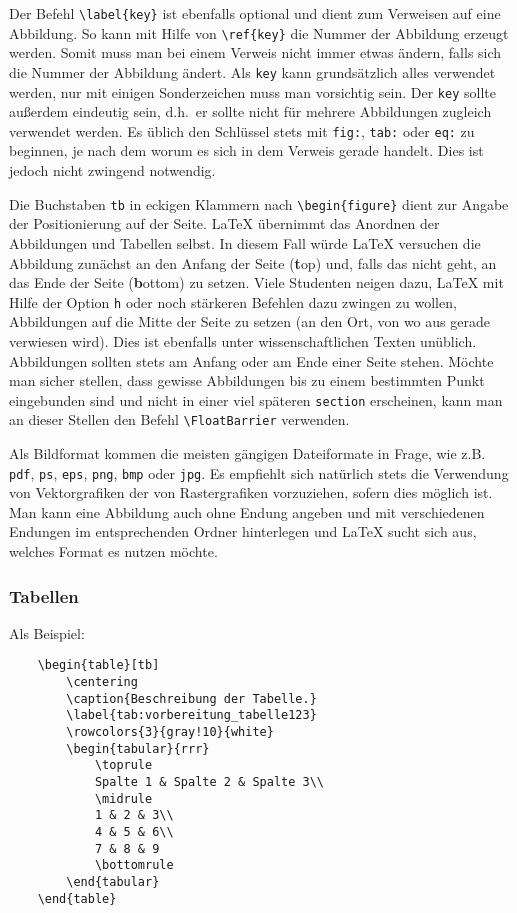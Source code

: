 Der Befehl \verb|\label{key}| ist ebenfalls optional und dient zum Verweisen auf eine Abbildung. So kann mit Hilfe von \verb|\ref{key}| die Nummer der Abbildung erzeugt werden. Somit muss man bei einem Verweis nicht immer etwas ändern, falls sich die Nummer der Abbildung ändert. Als \verb|key| kann grundsätzlich alles verwendet werden, nur mit einigen Sonderzeichen muss man vorsichtig sein. Der \verb|key| sollte außerdem eindeutig sein, d.h.~er sollte nicht für mehrere Abbildungen zugleich verwendet werden. Es üblich den Schlüssel stets mit \verb|fig:|, \verb|tab:| oder \verb|eq:| zu beginnen, je nach dem worum es sich in dem Verweis gerade handelt. Dies ist jedoch nicht zwingend notwendig.

Die Buchstaben \verb|tb| in eckigen Klammern nach \verb|\begin{figure}| dient zur Angabe der Positionierung auf der Seite. LaTeX übernimmt das Anordnen der Abbildungen und Tabellen selbst. In diesem Fall würde LaTeX versuchen die Abbildung zunächst an den Anfang der Seite (\textbf{t}op) und, falls das nicht geht, an das Ende der Seite (\textbf{b}ottom) zu setzen. Viele Studenten neigen dazu, LaTeX mit Hilfe der Option \verb|h| oder noch stärkeren Befehlen dazu zwingen zu wollen, Abbildungen auf die Mitte der Seite zu setzen (an den Ort, von wo aus gerade verwiesen wird). Dies ist ebenfalls unter wissenschaftlichen Texten unüblich. Abbildungen sollten stets am Anfang oder am Ende einer Seite stehen. Möchte man sicher stellen, dass gewisse Abbildungen bis zu einem bestimmten Punkt eingebunden sind und nicht in einer viel späteren \verb|section| erscheinen, kann man an dieser Stellen den Befehl \verb|\FloatBarrier| verwenden.

Als Bildformat kommen die meisten gängigen Dateiformate in Frage, wie z.B. \verb|pdf|, \verb|ps|, \verb|eps|, \verb|png|, \verb|bmp| oder \verb|jpg|. Es empfiehlt sich natürlich stets die Verwendung von Vektorgrafiken der von Rastergrafiken vorzuziehen, sofern dies möglich ist. Man kann eine Abbildung auch ohne Endung angeben und mit verschiedenen Endungen im entsprechenden Ordner hinterlegen und LaTeX sucht sich aus, welches Format es nutzen möchte.

\subsubsection{Tabellen}
Als Beispiel:
\begin{verbatim}
	\begin{table}[tb]
	    \centering
	    \caption{Beschreibung der Tabelle.}
	    \label{tab:vorbereitung_tabelle123}
	    \rowcolors{3}{gray!10}{white}
	    \begin{tabular}{rrr}
	        \toprule
	        Spalte 1 & Spalte 2 & Spalte 3\\
	        \midrule
	        1 & 2 & 3\\
	        4 & 5 & 6\\
	        7 & 8 & 9
	        \bottomrule
	    \end{tabular}
	\end{table}
\end{verbatim}

